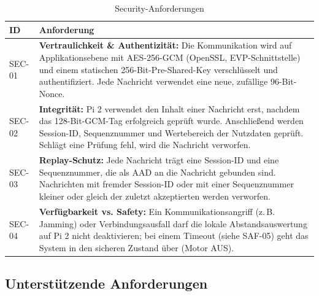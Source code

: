 \begin{table}[H]
    \centering
    \small
    \begin{tabularx}{\textwidth}{@{}p{1.5cm}Y@{}}
        \toprule
        \textbf{ID} & \textbf{Anforderung} \\
        \midrule
        SEC-01 & \textbf{Vertraulichkeit \& Authentizität:} Die Kommunikation wird auf Applikationsebene mit AES-256-GCM (OpenSSL, EVP-Schnittstelle) und einem statischen 256-Bit-Pre-Shared-Key verschlüsselt und authentifiziert. Jede Nachricht verwendet eine neue, zufällige 96-Bit-Nonce. \\
        SEC-02 & \textbf{Integrität:} Pi 2 verwendet den Inhalt einer Nachricht erst, nachdem das 128-Bit-GCM-Tag erfolgreich geprüft wurde. Anschließend werden Session-ID, Sequenznummer und Wertebereich der Nutzdaten geprüft. Schlägt eine Prüfung fehl, wird die Nachricht verworfen. \\
        SEC-03 & \textbf{Replay-Schutz:} Jede Nachricht trägt eine Session-ID und eine Sequenznummer, die als AAD an die Nachricht gebunden sind. Nachrichten mit fremder Session-ID oder mit einer Sequenznummer kleiner oder gleich der zuletzt akzeptierten werden verworfen. \\
        SEC-04 & \textbf{Verfügbarkeit vs. Safety:} Ein Kommunikationsangriff (z.\,B. Jamming) oder Verbindungsausfall darf die lokale Abstandsauswertung auf Pi 2 nicht deaktivieren; bei einem Timeout (siehe SAF-05) geht das System in den sicheren Zustand über (Motor AUS). \\
        \bottomrule
    \end{tabularx}
    \caption{Security-Anforderungen}
\end{table}

\subsection{Unterstützende Anforderungen}


